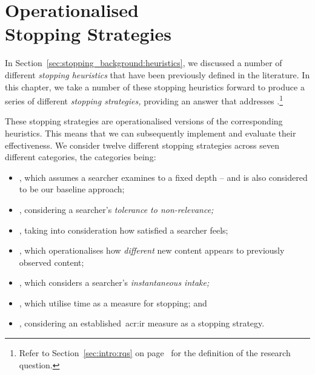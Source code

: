 
\chapter[Operationalised Stopping Strategies]{Operationalised\\Stopping Strategies}\label{chap:strategies}
In Section~\ref{sec:stopping_background:heuristics}, we discussed a number of different \emph{stopping heuristics} that have been previously defined in the literature. In this chapter, we take a number of these stopping heuristics forward to produce a series of different \emph{stopping strategies,} providing an answer that addresses .\footnote{Refer to Section~\ref{sec:intro:rqs} on page~\pageref{sec:intro:rqs} for the definition of the research question.}

\begin{figure}[h]
    \centering
    \vspace{4mm}
    \label{fig:conversion}
    \vspace{-5mm}
\end{figure}

These stopping strategies are operationalised versions of the corresponding heuristics. This means that we can subsequently implement and evaluate their effectiveness. We consider twelve different stopping strategies across seven different categories, the categories being:

\begin{itemize}
    \item{, which assumes a searcher examines to a fixed depth -- and is also considered to be our baseline approach;}
    \item{, considering a searcher's \emph{tolerance to non-relevance;}}
    \item{, taking into consideration how satisfied a searcher feels;}
    \item{, which operationalises how \emph{different} new content appears to previously observed content;}
    \item{, which considers a searcher's \emph{instantaneous intake;}}
    \item{, which utilise time as a measure for stopping; and}
    \item{, considering an established~\gls{acr:ir} measure as a stopping strategy.}
\end{itemize}

